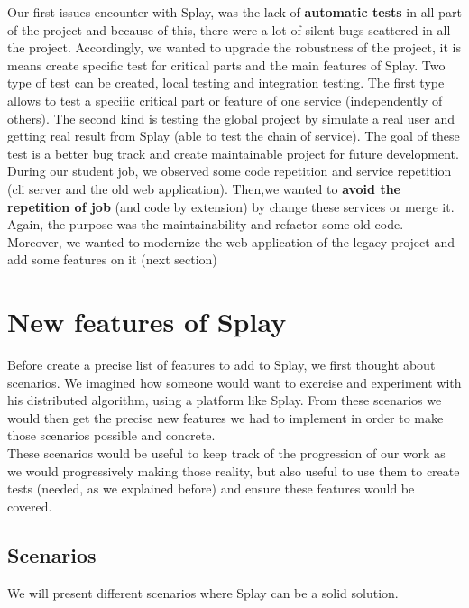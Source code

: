 \documentclass{eplmastersthesis}
\begin{document}
      Our first issues encounter with Splay, was the lack of
      \textbf{automatic tests} in all part of the project and because of this,
      there were a lot of silent bugs scattered in all the project.
      Accordingly, we wanted to upgrade the robustness of the project,
      it is means create specific test for critical parts and the main features
      of Splay. Two type of test can be created, local testing and integration
      testing. The first type allows to test a specific critical part or
      feature of one service (independently of others). The second kind is
      testing the global project by simulate a real user and getting real
      result from Splay (able to test the chain of service). The goal of these
      test is a better bug track and create maintainable project for future
      development.\\

      During our student job, we observed some code repetition and service
      repetition (cli server and the old web application). Then,we wanted
      to \textbf{avoid the repetition of job} (and code by extension) by
      change these services or merge it. Again, the purpose was the
      maintainability and refactor some old code. Moreover, we wanted to
      modernize the web application of the legacy project and add some
      features on it (next section)


    \section{New features of Splay}

     Before create a precise list of features to add to Splay, we first
     thought about scenarios. We imagined how someone would want to exercise
     and experiment with his distributed algorithm, using a platform like
     Splay. From these scenarios we would then get the precise new features
     we had to implement in order to make those scenarios possible and
     concrete.\\

     These scenarios would be useful to keep track of the progression of our
     work as we would progressively making those reality, but also useful
     to use them to create tests (needed, as we explained before) and ensure
     these features would be covered.

      \subsection{Scenarios}
        We will present different scenarios where Splay can be a solid solution.
\end{document}
